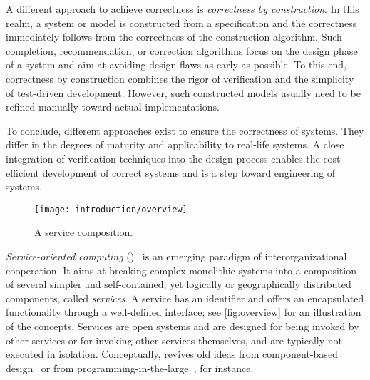 A different approach to achieve correctness is \emph{correctness by construction}. In this realm, a system or model is constructed from a specification and the correctness immediately follows from the correctness of the construction algorithm. Such completion, recommendation, or correction algorithms focus on the design phase of a system and aim at avoiding design flaws as early as possible. To this end, correctness by construction combines the rigor of verification and the simplicity of test-driven development. However, such constructed models usually need to be refined manually toward actual implementations.

To conclude, different approaches exist to ensure the correctness of systems. They differ in the degrees of maturity and applicability to real-life systems. A close integration of verification techniques into the design process enables the cost-efficient development of correct systems and is a step toward engineering of systems.

\bigskip

\begin{figure}
\centering
\texttt{[image: introduction/overview]}\hspace{4em}
\caption{A service composition.}
\label{fig:overview}
\end{figure}

\noindent\emph{Service-oriented computing} ()~\cite{Papazoglou_2001_cacm} is an emerging paradigm of interorganizational cooperation. It aims at breaking complex monolithic systems into a composition of several simpler and self-contained, yet logically or geographically distributed components, called \emph{services}. A service has an identifier and offers an encapsulated functionality through a well-defined interface; see \autoref{fig:overview} for an illustration of the concepts. Services are open systems and are designed for being invoked by other services or for invoking other services themselves, and are typically not executed in isolation. Conceptually,  revives old ideas from component-based design~\cite{Mcilroy_1969_sect,Szyperski_1998_book} or from programming-in-the-large~\cite{DeRemerK_1976_tse}, for instance.

